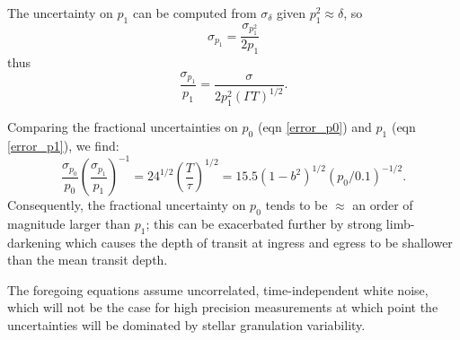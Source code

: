 \begin{subappendices}
The uncertainty on $p_1$ can be computed from $\sigma_\delta$ given $p_1^2 \approx \delta$, so 
\begin{equation}
\sigma_{p_1} = \frac{\sigma_{p_1^2}}{2 p_1}
\end{equation}
thus 
\begin{equation} \label{error_p1}
\frac{\sigma_{p_1}}{p_1} = \frac{\sigma}{2 p_1^2 (\Gamma T)^{1/2}}.
\end{equation}

Comparing the fractional uncertainties on $p_0$ (eqn \ref{error_p0}) and $p_1$ (eqn \ref{error_p1}),
we find:
\begin{equation}
\frac{\sigma_{p_0}}{p_0} \left(\frac{\sigma_{p_1}}{p_1}\right)^{-1} = 24^{1/2} \left(\frac{T}{\tau}\right)^{1/2} = 15.5 (1-b^2)^{1/2} (p_0/0.1)^{-1/2}.  
\end{equation}
Consequently, the fractional uncertainty on $p_0$ tends to be $\approx$ an order
of magnitude larger than $p_1$; this can be exacerbated further by strong limb-darkening
which causes the depth of transit at ingress and egress to be shallower than the
mean transit depth. 

The foregoing equations assume uncorrelated, time-independent 
white noise, which will not be the case for high precision measurements at which
point the uncertainties will be dominated by stellar granulation variability.






\end{subappendices}
